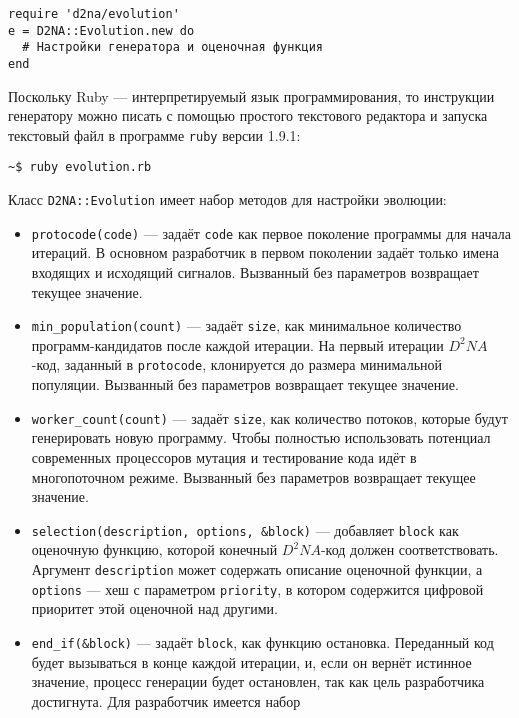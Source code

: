 \documentclass[utf8,a5paper,portrait,10pt]{eskdtext}
\begin{document}
\begin{verbatim}
require 'd2na/evolution'
e = D2NA::Evolution.new do
  # Настройки генератора и оценочная функция
end
\end{verbatim}

Поскольку Ruby — интерпретируемый язык программирования, то инструкции
генератору можно писать с помощью простого текстового редактора и запуска
текстовый файл в программе \texttt{ruby} версии 1.9.1:

\begin{verbatim}
~$ ruby evolution.rb
\end{verbatim}

Класс \texttt{D2NA::Evolution} имеет набор методов для настройки эволюции:
\begin{itemize}
  \item \texttt{protocode(code)} — задаёт \texttt{code} как первое поколение
        программы для начала итераций. В основном разработчик в первом поколении
        задаёт только имена входящих и исходящий сигналов.
        Вызванный без параметров возвращает текущее значение.
  \item \texttt{min\_population(count)} — задаёт \texttt{size}, как минимальное
        количество программ-кандидатов после каждой итерации. На первый итерации
        $D^2NA$-код, заданный в \texttt{protocode}, клонируется до размера
        минимальной популяции.
        Вызванный без параметров возвращает текущее значение.
  \item \texttt{worker\_count(count)} — задаёт \texttt{size}, как количество
        потоков, которые будут генерировать новую программу. Чтобы полностью
        использовать потенциал современных процессоров мутация и тестирование
        кода идёт в многопоточном режиме.
        Вызванный без параметров возвращает текущее значение.
  \item \texttt{selection(description, options, \&block)} — добавляет
        \texttt{block} как оценочную функцию, которой конечный $D^2NA$-код
        должен соответствовать. Аргумент \texttt{description} может содержать
        описание оценочной функции, а \texttt{options} — хеш с параметром
        \texttt{priority}, в котором содержится цифровой приоритет этой
        оценочной над другими.
  \item \texttt{end\_if(\&block)} — задаёт \texttt{block}, как функцию
        остановка. Переданный код будет вызываться в конце каждой итерации, и,
        если он вернёт истинное значение, процесс генерации будет остановлен,
        так как цель разработчика достигнута. Для разработчик имеется набор

\end{itemize}
\end{document}
